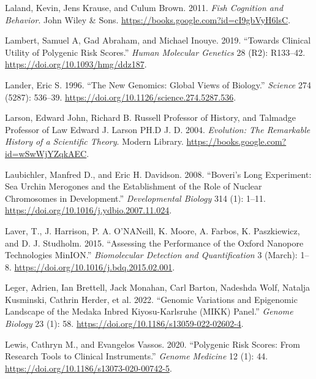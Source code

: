 \documentclass[
]{book}
\newlength{\cslhangindent}
\newlength{\cslentryspacingunit} %
\newenvironment{CSLReferences}[2] %
 {%
  \setlength{\parindent}{0pt}
  \ifodd #1
  \let\oldpar\par
  \def\par{\hangindent=\cslhangindent\oldpar}
  \fi
  \setlength{\parskip}{#2\cslentryspacingunit}
 }%
 {}
\begin{document}
\begin{CSLReferences}{1}{0}
\leavevmode{}%
Laland, Kevin, Jens Krause, and Culum Brown. 2011. \emph{Fish {Cognition} and {Behavior}}. {John Wiley \& Sons}. \url{https://books.google.com?id=cI9gbVyH6lsC}.

\leavevmode{}%
Lambert, Samuel A, Gad Abraham, and Michael Inouye. 2019. {``Towards Clinical Utility of Polygenic Risk Scores.''} \emph{Human Molecular Genetics} 28 (R2): R133--42. \url{https://doi.org/10.1093/hmg/ddz187}.

\leavevmode{}%
Lander, Eric S. 1996. {``The {New Genomics}: {Global Views} of {Biology}.''} \emph{Science} 274 (5287): 536--39. \url{https://doi.org/10.1126/science.274.5287.536}.

\leavevmode{}%
Larson, Edward John, Richard B. Russell Professor of History, and Talmadge Professor of Law Edward J. Larson PH.D J. D. 2004. \emph{Evolution: {The Remarkable History} of a {Scientific Theory}}. {Modern Library}. \url{https://books.google.com?id=wSwWjYZqkAEC}.

\leavevmode{}%
Laubichler, Manfred D., and Eric H. Davidson. 2008. {``Boveri's Long Experiment: {Sea} Urchin Merogones and the Establishment of the Role of Nuclear Chromosomes in Development.''} \emph{Developmental Biology} 314 (1): 1--11. \url{https://doi.org/10.1016/j.ydbio.2007.11.024}.

\leavevmode{}%
Laver, T., J. Harrison, P. A. O'NANeill, K. Moore, A. Farbos, K. Paszkiewicz, and D. J. Studholm. 2015. {``Assessing the Performance of the {Oxford Nanopore Technologies MinION}.''} \emph{Biomolecular Detection and Quantification} 3 (March): 1--8. \url{https://doi.org/10.1016/j.bdq.2015.02.001}.

\leavevmode{}%
Leger, Adrien, Ian Brettell, Jack Monahan, Carl Barton, Nadeshda Wolf, Natalja Kusminski, Cathrin Herder, et al. 2022. {``Genomic Variations and Epigenomic Landscape of the {Medaka Inbred Kiyosu-Karlsruhe} ({MIKK}) Panel.''} \emph{Genome Biology} 23 (1): 58. \url{https://doi.org/10.1186/s13059-022-02602-4}.

\leavevmode{}%
Lewis, Cathryn M., and Evangelos Vassos. 2020. {``Polygenic Risk Scores: From Research Tools to Clinical Instruments.''} \emph{Genome Medicine} 12 (1): 44. \url{https://doi.org/10.1186/s13073-020-00742-5}.


\end{CSLReferences}
\end{document}
